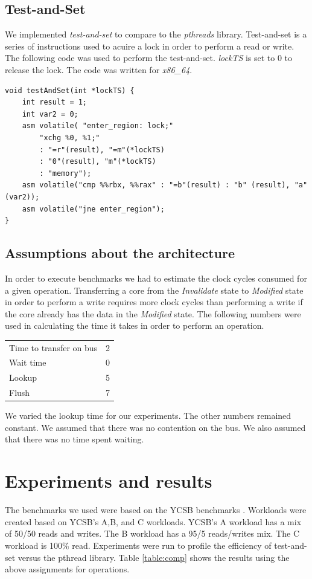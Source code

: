 \documentclass{article}
\begin{document}
\subsection{Test-and-Set}
We implemented \emph{test-and-set} to compare to the \emph{pthreads} library.
Test-and-set is a series of instructions used to acuire a lock in order to perform a read or write.
The following code was used to perform the test-and-set.
\emph{lockTS} is set to 0 to release the lock.
The code was written for \emph{x86\_64}.

\begin{verbatim}
void testAndSet(int *lockTS) {
    int result = 1;
    int var2 = 0;
    asm volatile( "enter_region: lock;"
        "xchg %0, %1;"
        : "=r"(result), "=m"(*lockTS)
        : "0"(result), "m"(*lockTS)
        : "memory");
    asm volatile("cmp %%rbx, %%rax" : "=b"(result) : "b" (result), "a" (var2));
    asm volatile("jne enter_region");
}
\end{verbatim}

\subsection{Assumptions about the architecture}
In order to execute benchmarks we had to estimate the clock cycles consumed for a given operation.
Transferring a core from the \emph{Invalidate} state to \emph{Modified} state in order to perform a write requires more clock cycles than performing a write if the core already has the data in the \emph{Modified} state.
The following numbers were used in calculating the time it takes in order to perform an operation.

\begin{center}
\begin{tabular}{lc}
Time to transfer on bus & 2\\
Wait time & 0\\
Lookup & 5\\
Flush & 7\\
\end{tabular}
\end{center}

We varied the lookup time for our experiments.  The other numbers remained constant. 
We assumed that there was no contention on the bus.
We also assumed that there was no time spent waiting.

\section{Experiments and results}\label{sec:results}
The benchmarks we used were based on the YCSB benchmarks \cite{ycsb}.
Workloads were created based on YCSB's A,B, and C workloads.
YCSB's A workload has a mix of 50/50 reads and writes.
The B workload has a 95/5 reads/writes mix.
The C workload is 100\% read.
Experiments were run to profile the efficiency of test-and-set versus the pthread library.
Table \ref{table:comp} shows the results using the above assignments for operations.
\end{document}
